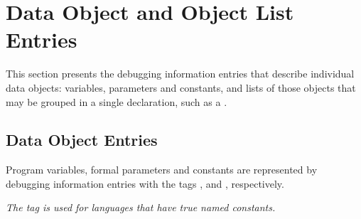 \chapter[Data Object and Object List]{Data Object and Object List Entries}
\label{chap:dataobjectandobjectlistentries}

This section presents the debugging information entries that
describe individual data objects: variables, parameters and
constants, and lists of those objects that may be grouped in
a single declaration, such as a 
.

\section{Data Object Entries}
\label{chap:dataobjectentries}

Program variables, 
formal parameters and constants are
represented by debugging information entries with the tags
\DWTAGvariableTARG{}, 
\DWTAGformalparameterTARG{} and 
\DWTAGconstantTARG{},
respectively.

\textit{The tag \DWTAGconstant{} is used for languages that
have true named constants.}

